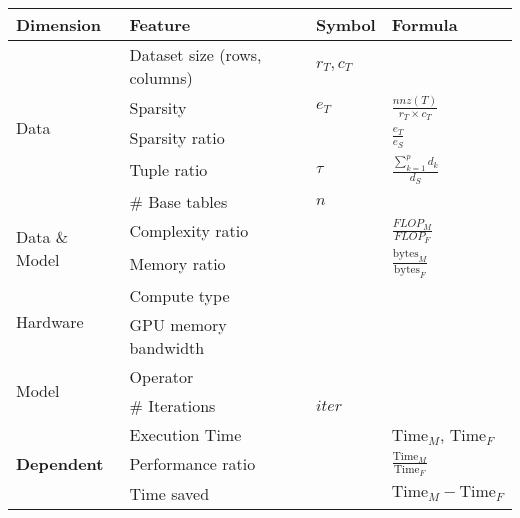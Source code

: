 \begin{tabular}{llll}
\toprule
Dimension & Feature & Symbol & Formula \\
\midrule\midrule
\multirow[t]{5}{*}{Data} & Dataset size (rows, columns) & $r_T, c_T$ &  \\

 & Sparsity & $e_T$ & $\frac{nnz(T)}{r_T\times c_T}$ \\

 & Sparsity ratio &  & $\frac{e_T}{e_S}$ \\

 & Tuple ratio & $\tau$ & $\frac{\sum_{k=1}^p d_k}{d_S}$ \\

 & \# Base tables & $n$ &  \\
 
\multirow[t]{2}{*}{Data \& Model} & Complexity ratio &  & $\frac{FLOP_M}{FLOP_F}$ \\

 & Memory ratio &  & $\frac{\text{bytes}_M}{\text{bytes}_F}$ \\
 
\multirow[t]{2}{*}{Hardware} & Compute type &  &  \\

 & GPU memory bandwidth &  &  \\
 
\multirow[t]{2}{*}{Model} & Operator &  &  \\

 & \# Iterations & $iter$ &  \\
 
\multirow[t]{3}{*}{\textbf{Dependent}} & Execution Time &  & $\text{Time}_M$, $\text{Time}_F$ \\

 & Performance ratio &  & $\frac{\text{Time}_M}{\text{Time}_F}$ \\

 & Time saved &  & $\text{Time}_M - \text{Time}_F$ \\
 
\bottomrule
\end{tabular}
